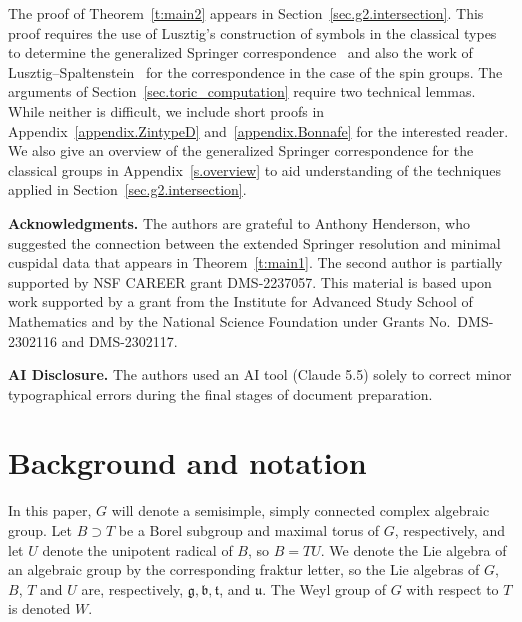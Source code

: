 \documentclass[reqno,11pt]{amsart}
\theoremstyle{remark}
\theoremstyle{remark}
\theoremstyle{definition}
\theoremstyle{definition}
\theoremstyle{definition}
\numberwithin{equation}{section}
\newcommand{\fb}{{\mathfrak b}}
\newcommand{\fg}{{\mathfrak g}}
\newcommand{\ft}{{\mathfrak t}}
\newcommand{\fu}{{\mathfrak u}}
\begin{document}
The proof of Theorem~\ref{t:main2} appears in Section~\ref{sec.g2.intersection}. This proof requires the use of Lusztig's construction of symbols in the classical types to determine the generalized Springer correspondence~\cite{Lu84} and also the work of Lusztig--Spaltenstein~\cite{LuSpal85} for the correspondence in the case of the spin groups. The arguments of Section~\ref{sec.toric_computation} require two technical lemmas. While neither is difficult, we include short proofs in Appendix~\ref{appendix.ZintypeD} and~\ref{appendix.Bonnafe} for the interested reader. We also give an overview of the generalized Springer correspondence for the classical groups in Appendix~\ref{s.overview} to aid understanding of the techniques applied in Section~\ref{sec.g2.intersection}. 



\noindent\textbf{Acknowledgments.} The authors are grateful to Anthony Henderson, who suggested the connection between the extended Springer resolution and minimal cuspidal data that appears in Theorem~\ref{t:main1}.  The second author is partially supported by NSF CAREER grant DMS-2237057. This material is based upon work supported by a grant from the Institute for Advanced Study School of Mathematics and by the National Science Foundation under Grants No.~DMS-2302116 and DMS-2302117.

\medskip

\noindent\textbf{AI Disclosure.} The authors used an AI tool (Claude 5.5) solely to correct minor typographical errors during the final stages of document preparation.



\section{Background and notation}\label{sec.notation}
In this paper, $G$ will denote a semisimple, simply connected complex algebraic group.  Let $B \supset T$ be a Borel subgroup and maximal torus of $G$, respectively, and let $U$ denote the unipotent radical of $B$, so $B = TU$.  We denote the Lie algebra of an algebraic group by the corresponding fraktur letter, so the Lie algebras of $G$, $B$, $T$ and $U$ are, respectively, $\fg, \fb, \ft$, and $\fu$.  The Weyl group of
$G$ with respect to $T$ is denoted $W$.  
\end{document}

